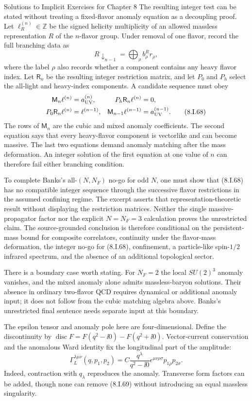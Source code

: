 \begin{bankssolutions}{Solutions to Implicit Exercises for Chapter 8}
The resulting integer test can be stated without treating a fixed-flavor
anomaly equation as a decoupling proof.  Let $\ell_R^{(n)}\in\mathbb Z$ be
the signed helicity multiplicity of an allowed massless representation $R$
of the $n$-flavor group.  Under removal of one flavor, record the full
branching data as
\[
 R\mathbin{\downarrow}_{n-1}
 =\bigoplus_\rho b^R_\rho r_\rho, \tag{8.I.67}
\]
where the label $\rho$ also records whether a component contains any heavy
flavor index.  Let $\mathsf R_n$ be the resulting integer restriction matrix,
and let $P_0$ and $P_h$ select the all-light and heavy-index components.  A
candidate sequence must obey
\begin{align*}
 \mathsf M_n\ell^{(n)}&=a_{\rm UV}^{(n)},
 &P_h\mathsf R_n\ell^{(n)}&=0,\\
 P_0\mathsf R_n\ell^{(n)}&=\ell^{(n-1)},
 &\mathsf M_{n-1}\ell^{(n-1)}&=a_{\rm UV}^{(n-1)}. \tag{8.I.68}
\end{align*}
The rows of $\mathsf M_n$ are the cubic and mixed anomaly coefficients.  The
second equation says that every heavy-flavor component is vectorlike and can
become massive.  The last two equations demand anomaly matching after the
mass deformation.  An integer solution of the first equation at one value of
$n$ can therefore fail either branching condition.

To complete Banks's all-$(N,N_F)$ no-go for odd $N$, one must show that
(8.I.68) has no compatible integer sequence through the successive flavor
restrictions in the assumed confining regime.  The excerpt asserts that
representation-theoretic result without displaying the restriction matrices.
Neither the single massive-propagator factor nor the explicit
$N=N_F=3$ calculation proves the unrestricted claim.  The source-grounded
conclusion is therefore conditional on the persistent-mass bound for
composite correlators, continuity under the flavor-mass deformation, the
integer no-go for (8.I.68), confinement, a particle-like spin-$1/2$ infrared
spectrum, and the absence of an additional topological sector.

There is a boundary case worth stating.  For $N_F=2$ the local
$SU(2)^3$ anomaly vanishes, and the mixed anomaly alone admits massless-baryon
solutions.  Their absence in ordinary two-flavor QCD requires dynamical or
additional anomaly input; it does not follow from the cubic matching algebra
above.  Banks's unrestricted final sentence needs separate input at this
boundary.

The epsilon tensor and anomaly pole here are four-dimensional.  Define the
discontinuity by $\operatorname{disc}F=F(q^2-\ii0)-F(q^2+\ii0)$.
Vector-current conservation and the anomalous Ward identity fix the
longitudinal part of the amplitude:
\[
 \Gamma_L^{\lambda\mu\nu}(q,p_1,p_2)
 =C\frac{q^\lambda}{q^2-\ii0}
 \epsilon^{\mu\nu\rho\sigma}p_{1\rho}p_{2\sigma}. \tag{8.I.69}
\]
Indeed, contraction with $q_\lambda$ reproduces the anomaly.  Transverse form
factors can be added, though none can remove (8.I.69) without introducing an
equal massless singularity.


\end{bankssolutions}
